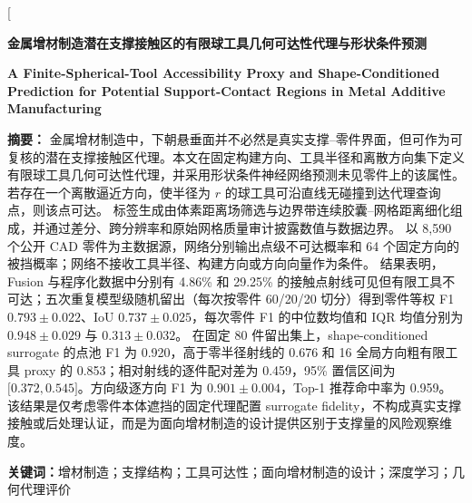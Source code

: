 \documentclass[UTF8,a4paper,twocolumn,zihao=5,fontset=fandol]{ctexart}
\begin{document}
\twocolumn[
\begin{@twocolumnfalse}
\begin{center}
  {\bfseries 金属增材制造潜在支撑接触区的有限球工具几何可达性代理与形状条件预测\par}
  \vspace{0.45em}
  {\large\bfseries A Finite-Spherical-Tool Accessibility Proxy and Shape-Conditioned Prediction for Potential Support-Contact Regions in Metal Additive Manufacturing\par}
\end{center}

\vspace{0.5em}
\begin{minipage}{\textwidth}
\noindent\textbf{摘要：}
金属增材制造中，下朝悬垂面并不必然是真实支撑--零件界面，但可作为可复核的潜在支撑接触区代理。本文在固定构建方向、工具半径和离散方向集下定义有限球工具几何可达性代理，并采用形状条件神经网络预测未见零件上的该属性。
若存在一个离散逼近方向，使半径为 $r$ 的球工具可沿直线无碰撞到达代理查询点，则该点可达。
标签生成由体素距离场筛选与边界带连续胶囊--网格距离细化组成，并通过差分、跨分辨率和原始网格质量审计披露数值与数据边界。
以 8,590 个公开 CAD 零件为主数据源，网络分别输出点级不可达概率和 64 个固定方向的被挡概率；网络不接收工具半径、构建方向或方向向量作为条件。
结果表明，Fusion 与程序化数据中分别有 4.86\% 和 29.25\% 的接触点射线可见但有限工具不可达；五次重复模型级随机留出（每次按零件 60/20/20 切分）得到零件等权 F1 $0.793\pm0.022$、IoU $0.737\pm0.025$，每次零件 F1 的中位数均值和 IQR 均值分别为 $0.948\pm0.029$ 与 $0.313\pm0.032$。
在固定 80 件留出集上，shape-conditioned surrogate 的点池 F1 为 0.920，高于零半径射线的 0.676 和 16 全局方向粗有限工具 proxy 的 0.853；相对射线的逐件配对差为 0.459，95\% 置信区间为 $\lbrack 0.372,0.545\rbrack$。方向级逐方向 F1 为 $0.901\pm0.004$，Top-1 推荐命中率为 0.959。
该结果是仅考虑零件本体遮挡的固定代理配置 surrogate fidelity，不构成真实支撑接触或后处理认证，而是为面向增材制造的设计提供区别于支撑量的风险观察维度。

\noindent\textbf{关键词：}增材制造；支撑结构；工具可达性；面向增材制造的设计；深度学习；几何代理评价


\end{minipage}
\end{@twocolumnfalse}
\end{document}
